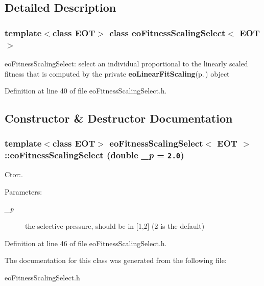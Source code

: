 \subsection{Detailed Description}
\subsubsection*{template$<$class EOT$>$ class eo\-Fitness\-Scaling\-Select$<$ EOT $>$}

eo\-Fitness\-Scaling\-Select: select an individual proportional to the linearly scaled fitness that is computed by the private {\bf eo\-Linear\-Fit\-Scaling}{\rm (p.\,\pageref{classeo_linear_fit_scaling})} object 



Definition at line 40 of file eo\-Fitness\-Scaling\-Select.h.

\subsection{Constructor \& Destructor Documentation}
\subsubsection{\setlength{\rightskip}{0pt plus 5cm}template$<$class EOT$>$ {\bf eo\-Fitness\-Scaling\-Select}$<$ {\bf EOT} $>$::{\bf eo\-Fitness\-Scaling\-Select} (double {\em \_\-p} = {\tt 2.0})\hspace{0.3cm}{\tt  [inline]}}\label{classeo_fitness_scaling_select_a0}


Ctor:. 

\begin{Desc}
\item[Parameters:]
\begin{description}
\item[{\em \_\-p}]the selective pressure, should be in [1,2] (2 is the default) \end{description}
\end{Desc}


Definition at line 46 of file eo\-Fitness\-Scaling\-Select.h.

The documentation for this class was generated from the following file:\begin{CompactItemize}
\item 
eo\-Fitness\-Scaling\-Select.h\end{CompactItemize}
